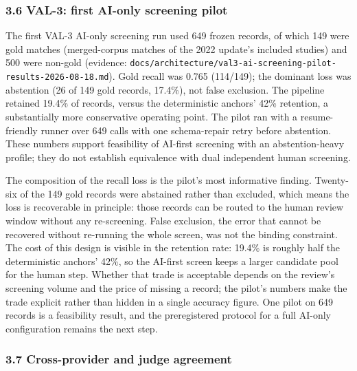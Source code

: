 \documentclass[
]{article}
\begin{document}
\subsubsection{3.6 VAL-3: first AI-only screening
pilot}\label{val-3-first-ai-only-screening-pilot}

The first VAL-3 AI-only screening run used 649 frozen records, of which
149 were gold matches (merged-corpus matches of the 2022 update's
included studies) and 500 were non-gold (evidence:
\texttt{docs/architecture/val3-ai-screening-pilot-results-2026-08-18.md}).
Gold recall was 0.765 (114/149); the dominant loss was abstention (26 of
149 gold records, 17.4\%), not false exclusion. The pipeline retained
19.4\% of records, versus the deterministic anchors' 42\% retention, a
substantially more conservative operating point. The pilot ran with a
resume-friendly runner over 649 calls with one schema-repair retry
before abstention. These numbers support feasibility of AI-first
screening with an abstention-heavy profile; they do not establish
equivalence with dual independent human screening.

The composition of the recall loss is the pilot's most informative
finding. Twenty-six of the 149 gold records were abstained rather than
excluded, which means the loss is recoverable in principle: those
records can be routed to the human review window without any
re-screening. False exclusion, the error that cannot be recovered
without re-running the whole screen, was not the binding constraint. The
cost of this design is visible in the retention rate: 19.4\% is roughly
half the deterministic anchors' 42\%, so the AI-first screen keeps a
larger candidate pool for the human step. Whether that trade is
acceptable depends on the review's screening volume and the price of
missing a record; the pilot's numbers make the trade explicit rather
than hidden in a single accuracy figure. One pilot on 649 records is a
feasibility result, and the preregistered protocol for a full AI-only
configuration remains the next step.

\subsubsection{3.7 Cross-provider and judge
agreement}\label{cross-provider-and-judge-agreement}
\end{document}
